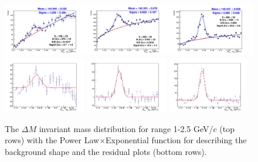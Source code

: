 \begin{figure}[tb]
\begin{center}
\includegraphics[width=1\textwidth]{figures/Dstar/pp13TeV/multi_trial/Figure_01.png} 
\includegraphics[width=0.32\textwidth]{figures/Dstar/pp13TeV/multi_trial/residual_plot_std_bkg_func_1-1dot5GeV.png} 
\includegraphics[width=0.32\textwidth]{figures/Dstar/pp13TeV/multi_trial/residual_plot_std_bkg_func_1dot5-2GeV.png}
\includegraphics[width=0.32\textwidth]{figures/Dstar/pp13TeV/multi_trial/residual_plot_std_bkg_func_2-2dot5GeV.png} 
\caption{The \Dstar $\Delta M$ invariant mass distribution for \pt range 1-2.5 GeV/$c$ (top rows) with the Power Law$\times$Exponential function for describing the background shape and the residual plots (bottom rows).}
\label{fig:Dstar_compar}
\end{center}
\end{figure}

